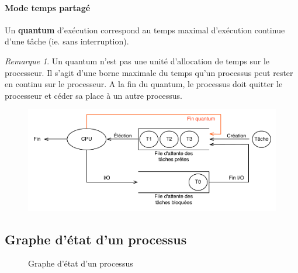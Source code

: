 \documentclass[11pt,english,french]{scrreprt}
\theoremstyle{remark}
\newtheorem*{rem*}{Remarque}
\theoremstyle{definition}
\begin{document}
\paragraph{Mode temps partagé} %
	Un \textbf{quantum} d'exécution correspond au temps maximal d'exécution continue d'une tâche (ie. sans interruption).
	\begin{rem*}
		Un quantum n'est pas une unité d'allocation de temps sur le processeur. Il s'agit d'une borne maximale du temps qu'un processus peut rester en continu sur le processeur. A la fin du quantum, le processus doit quitter le processeur et céder sa place à un autre processus.
	\end{rem*}
	\begin{figure}[h!]
		\center
		\includegraphics[scale=.75]{img/ordonnencement-split-time}
	\end{figure}


\subsection{Graphe d'état d'un processus} %

\begin{figure}[h]
  \centering
  \caption{Graphe d'état d'un processus}
\end{figure}
\end{document}

